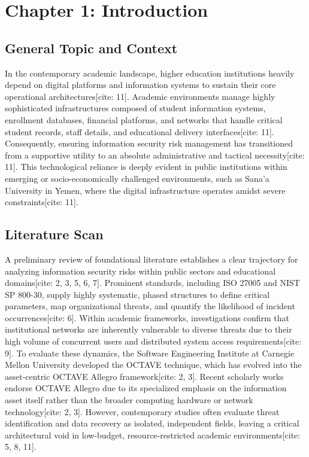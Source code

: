 \documentclass[journal,onecolumn,12pt,twoside]{IEEEtran}
\begin{document}
	\newpage
	
	\section{Chapter 1: Introduction}
	\label{sec:introduction}
	
	\subsection{General Topic and Context}
	\label{subsec:context}
	In the contemporary academic landscape, higher education institutions heavily depend on digital platforms and information systems to sustain their core operational architectures[cite: 11]. Academic environments manage highly sophisticated infrastructures composed of student information systems, enrollment databases, financial platforms, and networks that handle critical student records, staff details, and educational delivery interfaces[cite: 11]. Consequently, ensuring information security risk management has transitioned from a supportive utility to an absolute administrative and tactical necessity[cite: 11]. This technological reliance is deeply evident in public institutions within emerging or socio-economically challenged environments, such as Sana'a University in Yemen, where the digital infrastructure operates amidst severe constraints[cite: 11].
	
	\subsection{Literature Scan}
	\label{subsec:lit_scan}
	A preliminary review of foundational literature establishes a clear trajectory for analyzing information security risks within public sectors and educational domains[cite: 2, 3, 5, 6, 7]. Prominent standards, including ISO 27005 and NIST SP 800-30, supply highly systematic, phased structures to define critical parameters, map organizational threats, and quantify the likelihood of incident occurrences[cite: 6]. Within academic frameworks, investigations confirm that institutional networks are inherently vulnerable to diverse threats due to their high volume of concurrent users and distributed system access requirements[cite: 9]. To evaluate these dynamics, the Software Engineering Institute at Carnegie Mellon University developed the OCTAVE technique, which has evolved into the asset-centric OCTAVE Allegro framework[cite: 2, 3]. Recent scholarly works endorse OCTAVE Allegro due to its specialized emphasis on the information asset itself rather than the broader computing hardware or network technology[cite: 2, 3]. However, contemporary studies often evaluate threat identification and data recovery as isolated, independent fields, leaving a critical architectural void in low-budget, resource-restricted academic environments[cite: 5, 8, 11].
	
\end{document}
